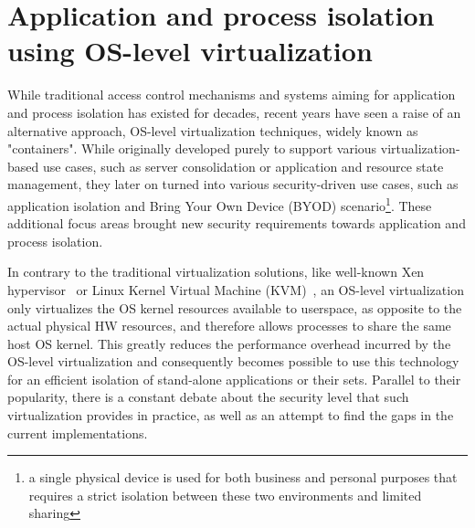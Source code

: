 \section{Application and process isolation using OS-level virtualization}
\label{sec:os-virt}

While traditional access control mechanisms and systems aiming for application and process isolation has existed for decades, recent years have seen a raise of an alternative approach, OS-level virtualization techniques, widely known as "containers". While originally developed purely to support various virtualization-based use cases, such as server consolidation or application and resource state management, they later on turned into various security-driven use cases, such as application isolation and Bring Your Own Device (BYOD) scenario\footnote{a single physical device is used for both business and personal purposes that requires a strict isolation between these two environments and limited sharing}. These additional focus areas brought new security requirements towards application and process isolation.

In contrary to the traditional virtualization solutions, like well-known Xen hypervisor~\cite{xenproject} or Linux Kernel Virtual Machine (KVM)~\cite{kvmproject}, an OS-level virtualization only virtualizes the OS kernel resources available to userspace, as opposite to the actual physical HW resources, and therefore allows processes to share the same host OS kernel. This greatly reduces the performance overhead incurred by the OS-level virtualization and consequently becomes possible to use this technology for an efficient isolation of stand-alone applications or their sets. Parallel to their popularity, there is a constant debate about the security level that such virtualization provides in practice, as well as an attempt to find the gaps in the current implementations. 


